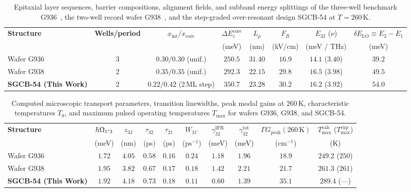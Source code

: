 \documentclass[11pt,letterpaper]{article}
\renewcommand{\hbar}{\mathchar'26\mkern-9mu h}
\begin{document}
\begin{table}[t!]
\centering
\caption{Epitaxial layer sequences, barrier compositions, alignment fields, and subband energy splittings of the three-well benchmark G936~\cite{Khalatpour2021}, the two-well record wafer G938~\cite{Khalatpour2023}, and the step-graded over-resonant design SGCB-54 at $T = 260\,\mathrm{K}$.}
\vspace{6pt}
\footnotesize
\begin{tabular}{@{}lccccccc@{}}
\toprule
\textbf{Structure} & \textbf{Wells/period} & $x_{\mathrm{int}} / x_{\mathrm{core}}$ & $\Delta E_c^{\mathrm{core}}$ & $L_p$ & $F_R$ & $E_{32}$ ($\nu$) & $\delta E_{\mathrm{LO}} \equiv E_2 - E_1$ \\
 & & & (meV) & (nm) & (kV/cm) & (meV / THz) & (meV) \\
\midrule
Wafer G936~\cite{Khalatpour2021} & 3 & $0.30 / 0.30$ (unif.) & $250.5$ & $31.40$ & $16.9$ & $14.1$ ($3.40$) & $39.2$ \\
Wafer G938~\cite{Khalatpour2023} & 2 & $0.35 / 0.35$ (unif.) & $292.3$ & $22.15$ & $29.8$ & $16.5$ ($3.98$) & $49.5$ \\
\textbf{SGCB-54 (This Work)} & 2 & $\mathbf{0.22 / 0.42}$ (2\,ML step) & $\mathbf{350.7}$ & $\mathbf{23.28}$ & $\mathbf{30.2}$ & $\mathbf{16.2}$ ($\mathbf{3.92}$) & $\mathbf{54.0}$ \\
\bottomrule
\end{tabular}
\label{tab:device_geometry}
\end{table}

\begin{table}[t!]
\centering
\caption{Computed microscopic transport parameters, transition linewidths, peak modal gains at $260\,\mathrm{K}$, characteristic temperatures $T_0$, and maximum pulsed operating temperatures $T_{\max}$ for wafers G936, G938, and SGCB-54.}
\vspace{6pt}
\footnotesize
\begin{tabular}{@{}lccccccccc@{}}
\toprule
\textbf{Structure} & $\hbar\Omega_{1'3}$ & $z_{32}$ & $\tau_{32}$ & $\tau_{21}$ & $W_{31'}$ & $\gamma_{32}^{\mathrm{IFR}}$ & $\gamma_{32}^{\mathrm{tot}}$ & $\Gamma G_{\mathrm{peak}}(260\,\mathrm{K})$ & $T_{\max}^{\mathrm{calc}}$ ($T_{\max}^{\mathrm{exp}}$) \\
 & (meV) & (nm) & (ps) & (ps) & ($\mathrm{ps}^{-1}$) & (meV) & (meV) & ($\mathrm{cm}^{-1}$) & (K) \\
\midrule
Wafer G936~\cite{Khalatpour2021} & $1.72$ & $4.05$ & $0.58$ & $0.16$ & $0.24$ & $1.18$ & $1.96$ & $18.9$ & $249.2$ ($250$) \\
Wafer G938~\cite{Khalatpour2023} & $1.95$ & $3.82$ & $0.67$ & $0.17$ & $0.18$ & $1.42$ & $2.21$ & $21.7$ & $261.3$ ($261$) \\
\textbf{SGCB-54 (This Work)} & $\mathbf{1.92}$ & $\mathbf{4.18}$ & $\mathbf{0.73}$ & $\mathbf{0.18}$ & $\mathbf{0.11}$ & $\mathbf{0.60}$ & $\mathbf{1.39}$ & $\mathbf{35.1}$ & $\mathbf{289.4}$ (---) \\
\bottomrule
\end{tabular}
\label{tab:transport_results}
\end{table}
\end{document}
